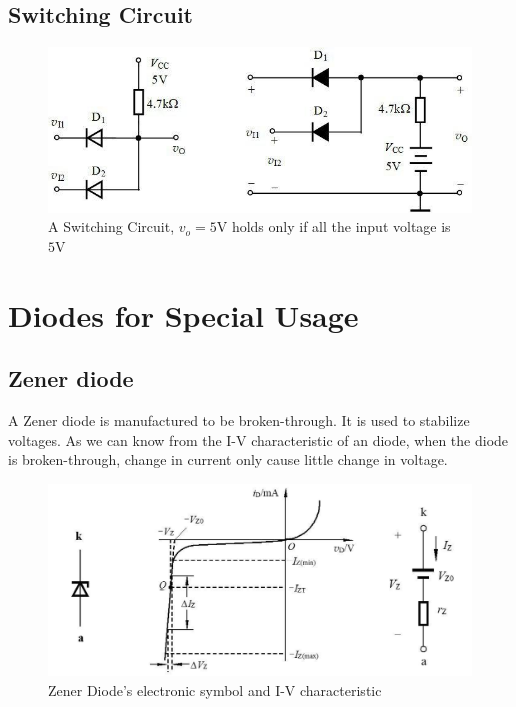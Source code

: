 \subsection{Switching Circuit}

\begin{figure}[H]
  \centering
  \includegraphics[width=0.9\linewidth]{figures/SwitchCircuit}
  \caption{A Switching Circuit, $v_o = 5 \mathrm{V}$ holds only if all the input voltage is $5 \mathrm{V}$}
  \label{fig:}
\end{figure}

\section{Diodes for Special Usage}

\subsection{Zener diode}

A Zener diode is manufactured to be broken-through. It is used to stabilize voltages. As we can know from the I-V characteristic of an diode, when the diode is broken-through, change in current only cause little change in voltage.

\begin{figure}[H]
  \centering
  \includegraphics[width=0.9\linewidth]{figures/Zener-diode-1}
  \caption{Zener Diode's electronic symbol and I-V characteristic}
  \label{fig:}
\end{figure}

